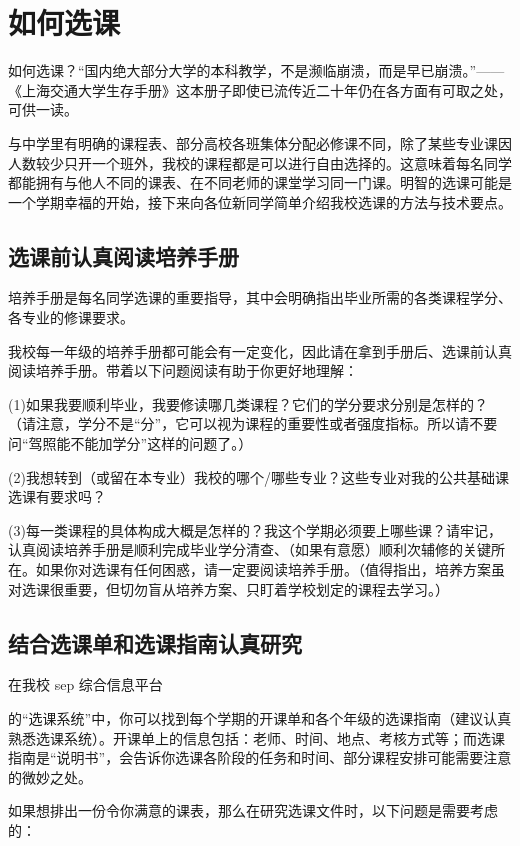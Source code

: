 \chapter{如何选课}

如何选课？“国内绝大部分大学的本科教学，不是濒临崩溃，而是早已崩溃。”——《上海交通大学生存手册》这本册子即使已流传近二十年仍在各方面有可取之处，可供一读。

与中学里有明确的课程表、部分高校各班集体分配必修课不同，除了某些专业课因人数较少只开一个班外，我校的课程都是可以进行自由选择的。这意味着每名同学都能拥有与他人不同的课表、在不同老师的课堂学习同一门课。明智的选课可能是一个学期幸福的开始，接下来向各位新同学简单介绍我校选课的方法与技术要点。

\section{选课前认真阅读培养手册}

培养手册是每名同学选课的重要指导，其中会明确指出毕业所需的各类课程学分、各专业的修课要求。

我校每一年级的培养手册都可能会有一定变化，因此请在拿到手册后、选课前认真阅读培养手册。带着以下问题阅读有助于你更好地理解：

(1)如果我要顺利毕业，我要修读哪几类课程？它们的学分要求分别是怎样的？（请注意，学分不是“分”，它可以视为课程的重要性或者强度指标。所以请不要问“驾照能不能加学分”这样的问题了。）

(2)我想转到（或留在本专业）我校的哪个/哪些专业？这些专业对我的公共基础课选课有要求吗？

(3)每一类课程的具体构成大概是怎样的？我这个学期必须要上哪些课？请牢记，认真阅读培养手册是顺利完成毕业学分清查、（如果有意愿）顺利次辅修的关键所在。如果你对选课有任何困惑，请一定要阅读培养手册。（值得指出，培养方案虽对选课很重要，但切勿盲从培养方案、只盯着学校划定的课程去学习。）

\section{结合选课单和选课指南认真研究}

在我校 sep 综合信息平台

的“选课系统”中，你可以找到每个学期的开课单和各个年级的选课指南（建议认真熟悉选课系统）。开课单上的信息包括：老师、时间、地点、考核方式等；而选课指南是“说明书”，会告诉你选课各阶段的任务和时间、部分课程安排可能需要注意的微妙之处。

如果想排出一份令你满意的课表，那么在研究选课文件时，以下问题是需要考虑的：

